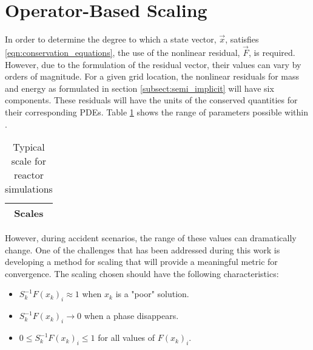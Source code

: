 \section{Operator-Based Scaling}
\label{sect:operator_scaling}
In order to determine the degree to which a state vector, $\vec{x}$, satisfies \eqref{eqn:conservation_equations}, the use of the nonlinear residual, $\vec{F}$, is required.
However, due to the formulation of the residual vector, their values can vary by orders of magnitude.
For a given grid location, the nonlinear residuals for mass and energy as formulated in section \ref{subsect:semi_implicit} will have six components.
These residuals will have the units of the conserved quantities for their corresponding PDEs.
Table \ref{tab:scaling_units_scales} shows the range of parameters possible within \cobra{}.

\begin{table}[ht]
\centering
\begin{tabular}{@{}c@{}} \toprule
Scales \\
\bottomrule  
\end{tabular}
\caption{Typical scale for reactor simulations}
\label{tab:scaling_units_scales}
\end{table}

However, during accident scenarios, the range of these values can dramatically change.
One of the challenges that has been addressed during this work is developing a method for scaling that will provide a meaningful metric for convergence.
The scaling chosen should have the following characteristics:
\begin{itemize}
\item{$S^{-1}_k F(x_k)_i \approx 1$ when $x_k$ is a "poor" solution.}
\item{$S^{-1}_k F(x_k)_i \rightarrow 0$ when a phase disappears.}
\item{$0 \leq S^{-1}_k F(x_k)_i \leq 1 $ for all values of $F(x_k)_i$.}
\end{itemize}

